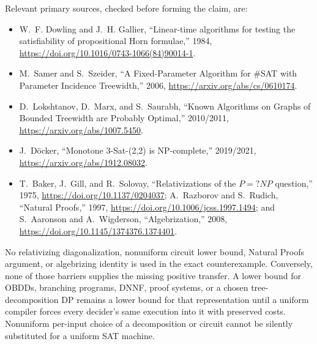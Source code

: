 \documentclass[11pt]{article}
\begin{document}
Relevant primary sources, checked before forming the claim, are:
\begin{itemize}[leftmargin=*]
\item W.~F. Dowling and J.~H. Gallier, ``Linear-time algorithms for testing
the satisfiability of propositional Horn formulae,'' 1984,
\url{https://doi.org/10.1016/0743-1066(84)90014-1}.
\item M.~Samer and S.~Szeider, ``A Fixed-Parameter Algorithm for \#SAT with
Parameter Incidence Treewidth,'' 2006,
\url{https://arxiv.org/abs/cs/0610174}.
\item D.~Lokshtanov, D.~Marx, and S.~Saurabh, ``Known Algorithms on Graphs
of Bounded Treewidth are Probably Optimal,'' 2010/2011,
\url{https://arxiv.org/abs/1007.5450}.
\item J.~Döcker, ``Monotone 3-Sat-(2,2) is NP-complete,'' 2019/2021,
\url{https://arxiv.org/abs/1912.08032}.
\item T.~Baker, J.~Gill, and R.~Solovay, ``Relativizations of the
$P=?NP$ question,'' 1975, \url{https://doi.org/10.1137/0204037};
A.~Razborov and S.~Rudich, ``Natural Proofs,'' 1997,
\url{https://doi.org/10.1006/jcss.1997.1494}; and S.~Aaronson and
A.~Wigderson, ``Algebrization,'' 2008,
\url{https://doi.org/10.1145/1374376.1374401}.
\end{itemize}

No relativizing diagonalization, nonuniform circuit lower bound, Natural
Proofs argument, or algebrizing identity is used in the exact counterexample.
Conversely, none of those barriers supplies the missing positive transfer.
A lower bound for OBDDs, branching programs, DNNF, proof systems, or a chosen
tree-decomposition DP remains a lower bound for that representation until a
uniform compiler forces every decider's same execution into it with
preserved costs.  Nonuniform per-input choice of a decomposition or circuit
cannot be silently substituted for a uniform SAT machine.
\end{document}
